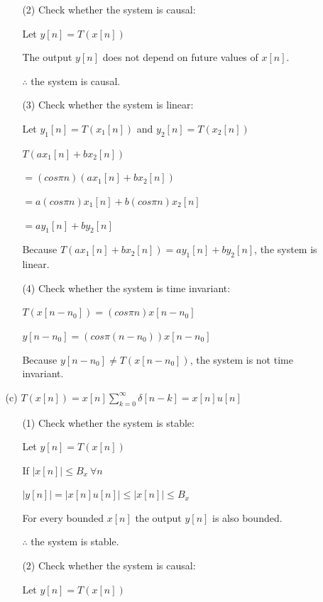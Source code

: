 \documentclass[fleqn]{article}
\begin{document}
\begin{enumerate}[nolistsep]
\begin{enumerate}[nolistsep]
\begin{enumerate}[nolistsep]
					\item[(2)] Check whether the system is causal:
					
					Let $y[n] = T(x[n])$
					
					The output $y[n]$ does not depend on future values of $x[n]$.
					
					$\therefore$ the system is causal.
					
					\item[(3)] Check whether the system is linear:
					
					Let $y_1[n] = T(x_1[n])$ and $y_2[n] = T(x_2[n])$
					
					$T(ax_1[n] + bx_2[n])$
					
					$ = (cos{\pi}n)(ax_1[n] + bx_2[n])$
					
					$ = a(cos{\pi}n)x_1[n] + b(cos{\pi}n)x_2[n]$
					
					$ = ay_1[n] + by_2[n]$
					
					Because $T(ax_1[n] + bx_2[n]) = ay_1[n] + by_2[n]$, the system is linear.
					
					\item[(4)] Check whether the system is time invariant:
					
					$T(x[n-n_0]) = (cos{\pi}n)x[n-n_0]$
					
					$y[n-n_0] = (cos{\pi}(n-n_0))x[n-n_0]$
					
					Because $y[n-n_0] \neq T(x[n-n_0])$, the system is not time invariant.
				\end{enumerate}
					
				\item[(c)] $T(x[n]) = x[n]\sum_{k=0}^{\infty}{\delta[n-k]} = x[n]u[n]$
					
				\begin{enumerate}[nolistsep]
					\item[(1)] Check whether the system is stable:
			
					Let $y[n] = T(x[n])$
			
					If $|x[n]| \leq B_x\ \forall n$
			
					$|y[n]| = |x[n]u[n]| \leq |x[n]| \leq B_x$
			
					For every bounded $x[n]$ the output $y[n]$ is also bounded.
			
					$\therefore$ the system is stable.
					
					\item[(2)] Check whether the system is causal:
					
					Let $y[n] = T(x[n])$
					

\end{enumerate}
\end{enumerate}
\end{enumerate}
\end{document}

